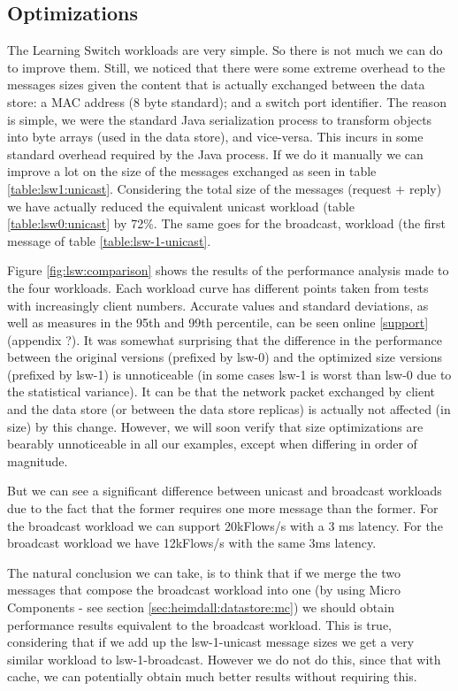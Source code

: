 \subsection{Optimizations}
The Learning Switch workloads are very simple. So there is
not much we can do to improve them. Still, we noticed that there were
some extreme overhead to the messages sizes given the content that is
actually exchanged between the data store: a MAC address (8 byte
standard); and  a switch port identifier. The reason is simple, we
were the standard Java serialization process to
transform objects into byte arrays (used in the data store), and
vice-versa. This incurs in some standard overhead required by the Java
process. If we do it manually we can improve a lot on the size of the
messages exchanged as seen in table
\ref{table:lsw1:unicast}. Considering the total size of the messages
(request $+$ reply) we have actually reduced the equivalent unicast workload (table
\ref{table:lsw0:unicast} by 72\%. The same goes for the broadcast,
workload (the first message of table \ref{table:lsw-1-unicast}. 

Figure \ref{fig:lsw:comparison}  shows the results of the performance
analysis made to the four workloads. Each workload  curve has different points
taken from tests with increasingly client numbers. Accurate values and standard
deviations, as well as measures in the 95th and 99th percentile, can
be seen online \ref{support} (appendix ?).  It was somewhat surprising
that the difference in the performance between the original versions
(prefixed by lsw-0) and the optimized size versions (prefixed by
lsw-1) is unnoticeable (in some cases lsw-1 is worst than lsw-0 due to
the statistical variance). It can be that the network packet exchanged by
client and the data store (or between the data store replicas) is
actually not affected (in size) by this change. However, we will soon
verify that size optimizations are bearably unnoticeable in all our examples, except
when differing in order of magnitude. 

But we can see a significant difference between unicast and broadcast
workloads due to the fact that the former requires one more message
than the former. For the broadcast workload we can support 20kFlows/s
with a 3 ms latency. For the broadcast workload we have 12kFlows/s
with the same 3ms latency. 

The natural conclusion we can take, is to think that if we merge the
two messages that compose the broadcast workload into one (by using
Micro Components - see section \ref{sec:heimdall:datastore:mc}) we
should obtain performance results equivalent to the broadcast
workload. This is true, considering that if we add up the
lsw-1-unicast message sizes we get a very similar workload to
lsw-1-broadcast. However we do not do this, since that with cache, we
can potentially obtain much better results without requiring this. 

